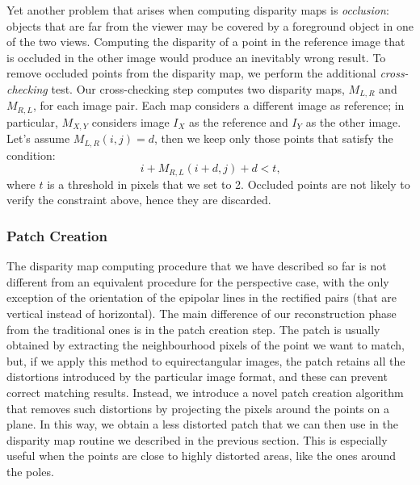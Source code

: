 Yet another problem that arises when computing disparity maps is
\emph{occlusion}: objects that are far from the viewer may be covered by a
foreground object in one of the two views.
Computing the disparity of a point in the reference image that is occluded in
the other image would produce an inevitably wrong result.
To remove occluded points from the disparity map, we perform the additional
\emph{cross-checking} test.
Our cross-checking step computes two disparity maps, $M_{L,R}$ and $M_{R,L}$,
for each image pair. Each map considers a different image as reference;
in particular, $M_{X,Y}$ considers image $I_X$ as the reference and $I_Y$ as the
other image. Let's assume $M_{L,R}(i, j) = d$, then we keep only those points
that satisfy the condition:
%
\begin{equation*}
	i + M_{R, L}(i + d, j) + d< t \text{,}
\end{equation*}
%
\noindent where $t$ is a threshold in pixels that we set to 2.
Occluded points are not likely to verify the constraint above, hence they are
discarded.
\subsubsection{Patch Creation}
\label{subsubsec:patch_creation}
The disparity map computing procedure that we have described so far is not
different from an equivalent procedure for the perspective case,
with the only exception of the orientation of the epipolar lines in the
rectified pairs (that are vertical instead of horizontal).
The main difference of our reconstruction phase from the traditional ones is
in the patch creation step.
The patch is usually obtained by extracting the neighbourhood pixels of the point we want
to match, but, if we apply this method to equirectangular images, the patch retains all
the distortions introduced by the particular image format, and these can prevent
correct matching results.
Instead, we introduce a novel patch creation algorithm that removes such
distortions by projecting the pixels around the points on a plane.
In this way, we obtain a less distorted patch that we can then use in the
disparity map routine we described in the previous section.
This is especially useful when the points are close to highly distorted areas,
like the ones around the poles.

